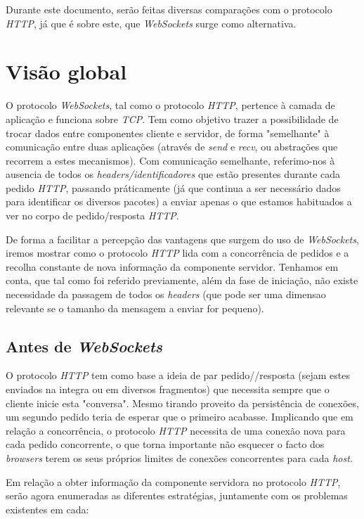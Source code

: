 \documentclass[a4paper]{article}
\begin{document}
Durante este documento, serão feitas diversas comparações com o protocolo \emph{HTTP}, já que é sobre este, que \emph{WebSockets} surge como alternativa.

\section{Visão global}

O protocolo \emph{WebSockets}, tal como o protocolo \emph{HTTP}, pertence à camada de aplicação e funciona sobre \emph{TCP}. Tem como objetivo trazer a possibilidade de trocar dados entre componentes cliente e servidor, de forma "semelhante" à comunicação entre duas aplicações (através de \emph{send} e \emph{recv}, ou abstrações que recorrem a estes mecanismos). Com comunicação semelhante, referimo-nos à ausencia de todos os \emph{headers/identificadores} que estão presentes durante cada pedido \emph{HTTP}, passando práticamente (já que continua a ser necessário dados para identificar os diversos pacotes) a enviar apenas o que estamos habituados a ver no corpo de pedido/resposta \emph{HTTP}.

De forma a facilitar a percepção das vantagens que surgem do uso de \emph{WebSockets}, iremos mostrar como o protocolo \emph{HTTP} lida com a  concorrência de pedidos e a recolha constante de nova informação da componente servidor. Tenhamos em conta, que tal como foi referido previamente, além da fase de iniciação, não existe necessidade da passagem de todos os \emph{headers} (que pode ser uma dimensao relevante se o tamanho da mensagem a enviar for pequeno).

\subsection{Antes de \emph{WebSockets}}

O protocolo \emph{HTTP} tem como base a ideia de par pedido//resposta (sejam estes enviados na integra ou em diversos fragmentos) que necessita sempre que o cliente inicie esta "conversa". Mesmo tirando proveito da persistência de conexões, um segundo pedido teria de esperar que o primeiro acabasse. Implicando que em relação a concorrência, o protocolo \emph{HTTP} necessita de uma conexão nova para cada pedido concorrente, o que torna importante não esquecer o facto dos \emph{browsers} terem os seus próprios limites de conexões concorrentes para cada \emph{host}.

Em relação a obter informação da componente servidora no protocolo \emph{HTTP}, serão agora enumeradas as diferentes estratégias,  juntamente com os problemas existentes em cada:
\end{document}
